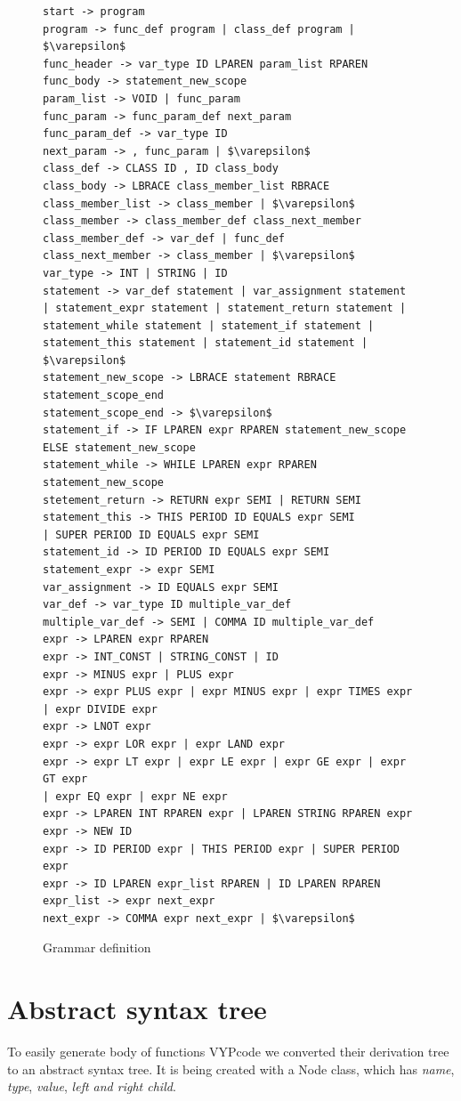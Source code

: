 \documentclass[12pt]{article}
\begin{document}
\begin{figure}
\begin{lstlisting}[mathescape]
start -> program
program -> func_def program | class_def program | $\varepsilon$
func_header -> var_type ID LPAREN param_list RPAREN
func_body -> statement_new_scope
param_list -> VOID | func_param
func_param -> func_param_def next_param
func_param_def -> var_type ID
next_param -> , func_param | $\varepsilon$
class_def -> CLASS ID , ID class_body
class_body -> LBRACE class_member_list RBRACE
class_member_list -> class_member | $\varepsilon$
class_member -> class_member_def class_next_member
class_member_def -> var_def | func_def
class_next_member -> class_member | $\varepsilon$
var_type -> INT | STRING | ID
statement -> var_def statement | var_assignment statement 
| statement_expr statement | statement_return statement | 
statement_while statement | statement_if statement | 
statement_this statement | statement_id statement | $\varepsilon$
statement_new_scope -> LBRACE statement RBRACE statement_scope_end
statement_scope_end -> $\varepsilon$
statement_if -> IF LPAREN expr RPAREN statement_new_scope
ELSE statement_new_scope
statement_while -> WHILE LPAREN expr RPAREN statement_new_scope
stetement_return -> RETURN expr SEMI | RETURN SEMI
statement_this -> THIS PERIOD ID EQUALS expr SEMI 
| SUPER PERIOD ID EQUALS expr SEMI
statement_id -> ID PERIOD ID EQUALS expr SEMI
statement_expr -> expr SEMI
var_assignment -> ID EQUALS expr SEMI
var_def -> var_type ID multiple_var_def
multiple_var_def -> SEMI | COMMA ID multiple_var_def
expr -> LPAREN expr RPAREN
expr -> INT_CONST | STRING_CONST | ID
expr -> MINUS expr | PLUS expr
expr -> expr PLUS expr | expr MINUS expr | expr TIMES expr 
| expr DIVIDE expr
expr -> LNOT expr
expr -> expr LOR expr | expr LAND expr
expr -> expr LT expr | expr LE expr | expr GE expr | expr GT expr 
| expr EQ expr | expr NE expr
expr -> LPAREN INT RPAREN expr | LPAREN STRING RPAREN expr
expr -> NEW ID
expr -> ID PERIOD expr | THIS PERIOD expr | SUPER PERIOD expr
expr -> ID LPAREN expr_list RPAREN | ID LPAREN RPAREN
expr_list -> expr next_expr
next_expr -> COMMA expr next_expr | $\varepsilon$
\end{lstlisting}
\caption{Grammar definition}
\label{fig:grammar}
\end{figure}

\newpage
\section{Abstract syntax tree}
To easily generate body of functions VYPcode we converted their derivation tree to an abstract syntax tree.
It is being created with a Node class, which has \emph{name}, \emph{type}, \emph{value}, \emph{left and right child}.
\end{document}
